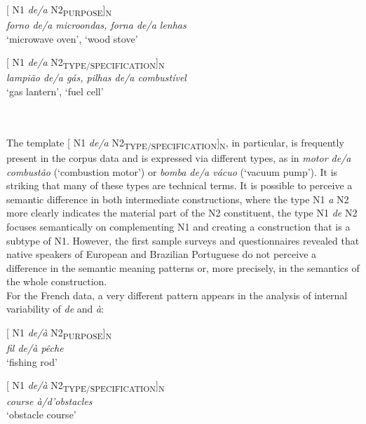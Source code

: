 \documentclass[output=paper]{langsci/langscibook}
\begin{document}
\begin{minipage}{0.4\textwidth}    %
[ N1 \textit{de/a} N2\textsubscript{PURPOSE}]\textsubscript{N}\\
\textit{forno de/a microondas,  forna de/a lenhas}\\
`microwave oven',         `wood stove'

\end{minipage}
\hfill            %
\begin{minipage}{0.4\textwidth}
[ N1 \textit{de/a} N2\textsubscript{TYPE/SPECIFICATION}]\textsubscript{N}\\
\textit{lampião de/a gás,   pilhas de/a combustível }\\
`gas lantern',           `fuel cell'
\end{minipage} \\
\\

The template [ N1 \textit{de/a} N2\textsubscript{TYPE/SPECIFICATION}]\textsubscript{N}, in particular, is frequently present in the corpus data and is expressed via different types, as in \textit{motor de/a combustão} (`combustion motor') or \textit{bomba de/a vácuo} (`vacuum pump'). It is striking that many of these types are technical terms. It is possible to perceive a semantic difference in both intermediate constructions, where the type N1 \textit{a} N2 more clearly indicates the material part of the N2 constituent, the type N1 \textit{de} N2 focuses semantically on complementing N1 and creating a construction that is a subtype of N1. However, the first sample surveys and questionnaires revealed that native speakers of European and Brazilian Portuguese do not perceive a difference in the semantic meaning patterns or, more precisely, in the semantics of the whole construction.\\

For the French data, a very different pattern appears in the analysis of internal variability of \textit{de} and \textit{à}: \\

 \begin{minipage}{0.4\textwidth}    %
[ N1 \textit{de/à} N2\textsubscript{PURPOSE}]\textsubscript{N}\\
\textit{fil de/à pêche}\\
`fishing rod'
\end{minipage} 
\hfill            %
\begin{minipage}{0.4\textwidth}
[ N1 \textit{de/à} N2\textsubscript{TYPE/SPECIFICATION}]\textsubscript{N}\\
\textit{course à/d’obstacles}\\
`obstacle course'
\end{minipage} 
\vspace{0.5cm}
\end{document}
